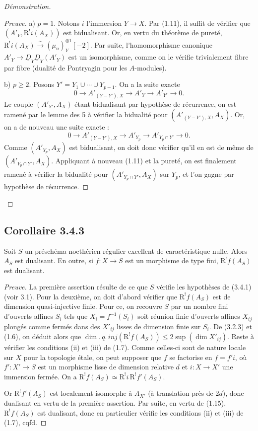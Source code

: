 \documentclass[11pt]{article}
\newcommand{\R}{\mathrm{R}}
\begin{document}
\begin{proof}[Démonstration]
\begin{proof}[Preuve]
a) $p = 1$. Notons $i$ l'immersion $Y \to X$. Par (1.11), il suffit de vérifier que $(A'_Y, \R^{!}i(A_X))$ est bidualisant. Or, en vertu du théorème de pureté, $\R^{!}i(A_X) \xrightarrow{\sim} (\mu_n)^{\otimes 1}_Y[-2]$. Par suite, l'homomorphisme canonique $A'_Y \to \underline{D}_Y \underline{D}_Y(A'_Y)$ est un isomorphisme, comme on le vérifie trivialement fibre par fibre (dualité de Pontryagin pour les $A$-modules).

b) $p \geqslant 2$. Posons $Y' = Y_1 \cup \cdots \cup Y_{p-1}$. On a la suite exacte
\[
0 \longrightarrow A'_{(Y-Y'),X} \longrightarrow A'_Y \longrightarrow A'_{Y'} \longrightarrow 0.
\]
Le couple $(A'_{Y'}, A_X)$ étant bidualisant par hypothèse de récurrence, on est ramené par le lemme des 5 à vérifier la bidualité pour $(A'_{(Y-Y'),X}, A_X)$. Or, on a de nouveau une suite exacte :
\[
0 \longrightarrow A'_{(Y-Y'),X} \longrightarrow A'_{Y_p} \longrightarrow A'_{Y_p \cap Y'} \longrightarrow 0.
\]
Comme $(A'_{Y_p}, A_X)$ est bidualisant, on doit donc vérifier qu'il en est de même de $(A'_{Y_p \cap Y'}, A_X)$. Appliquant à nouveau (1.11) et la pureté, on est finalement ramené à vérifier la bidualité pour $(A'_{Y_p \cap Y'}, A_X)$ sur $Y_p$, et l'on gagne par hypothèse de récurrence.
\end{proof}
\end{proof}

\subsection*{Corollaire 3.4.3}
Soit $S$ un préschéma noethérien régulier excellent de caractéristique nulle. Alors $A_S$ est dualisant. En outre, si $f : X \to S$ est un morphisme de type fini, $\R^{!}f(A_S)$ est dualisant.

\begin{proof}[Preuve]
La première assertion résulte de ce que $S$ vérifie les hypothèses de (3.4.1) (voir 3.1). Pour la deuxième, on doit d'abord vérifier que $\R^{!}f(A_S)$ est de dimension quasi-injective finie. Pour ce, on recouvre $S$ par un nombre fini d'ouverts affines $S_i$ tels que $X_i = f^{-1}(S_i)$ soit réunion finie d'ouverts affines $X_{ij}$ plongés comme fermés dans des $X'_{ij}$ lisses de dimension finie sur $S_i$. De (3.2.3) et (1.6), on déduit alors que $\dim.\,q.\,inj(\R^{!}f(A_S)) \leqslant 2\sup(\dim X'_{ij})$. Reste à vérifier les conditions (ii) et (iii) de (1.7). Comme celles-ci sont de nature locale sur $X$ pour la topologie étale, on peut supposer que $f$ se factorise en $f = f'i$, où $f' : X' \to S$ est un morphisme lisse de dimension relative $d$ et $i : X \to X'$ une immersion fermée. On a $\R^{!}f(A_S) \simeq \R^{!}i \, \R^{!}f'(A_S)$.

Or $\R^{!}f'(A_S)$ est localement isomorphe à $A_{X'}$ (à translation près de $2d$), donc dualisant en vertu de la première assertion. Par suite, en vertu de (1.15), $\R^{!}f(A_S)$ est dualisant, donc en particulier vérifie les conditions (ii) et (iii) de (1.7), cqfd.
\end{proof}
\end{document}
